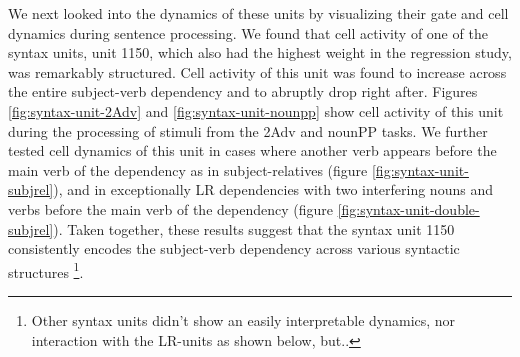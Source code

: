 We next looked into the dynamics of these units by visualizing their gate and cell dynamics during sentence processing. We found that cell activity of one of the syntax units, unit 1150, which also had the highest weight in the regression study, was remarkably structured. Cell activity of this unit was found to increase across the entire subject-verb dependency and to abruptly drop right after. Figures \ref{fig:syntax-unit-2Adv} and \ref{fig:syntax-unit-nounpp} show cell activity of this unit during the processing of stimuli from the 2Adv and nounPP tasks. We further tested cell dynamics of this unit in cases where another verb appears before the main verb of the dependency as in subject-relatives (figure \ref{fig:syntax-unit-subjrel}), and in exceptionally LR dependencies with two interfering nouns and verbs before the main verb of the dependency (figure \ref{fig:syntax-unit-double-subjrel}). Taken together, these results suggest that the syntax unit 1150 consistently encodes the subject-verb dependency across various syntactic structures \footnote{Other syntax units didn't show an easily interpretable dynamics, nor interaction with the LR-units as shown below, but..}.


